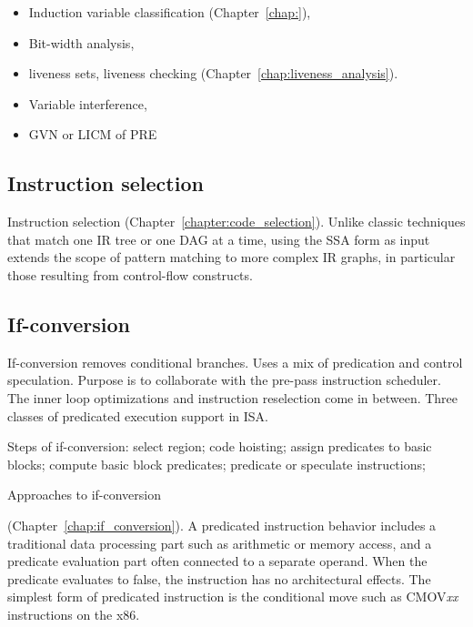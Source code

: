\begin{itemize}

\item Induction variable classification (Chapter~\ref{chap:}),

\item Bit-width analysis,

\item liveness sets, liveness checking
(Chapter~\ref{chap:liveness_analysis}).

\item Variable interference,

\item GVN or LICM of PRE

\end{itemize}

\subsection{Instruction selection}

Instruction selection (Chapter~\ref{chapter:code_selection}). Unlike
classic techniques that match one IR tree or one DAG at a time, using the SSA
form as input extends the scope of pattern matching to more complex IR graphs,
in particular those resulting from control-flow constructs.

\subsection{If-conversion}

If-conversion removes conditional branches. Uses a mix of predication and
control speculation. Purpose is to collaborate with the pre-pass instruction
scheduler. The inner loop optimizations and instruction reselection come in
between. Three classes of predicated execution support in ISA.
\cite{Mahlke:1995:ISCA} \cite{Chuang:2003:CGO}


Steps of if-conversion: select region; code hoisting; assign predicates to
basic blocks; compute basic block predicates; predicate or speculate
instructions;

Approaches to if-conversion

(Chapter~\ref{chap:if_conversion}). A predicated instruction behavior includes a
traditional data processing part such as arithmetic or memory access, and a
predicate evaluation part often connected to a separate operand. When the
predicate evaluates to false, the instruction has no architectural effects. The
simplest form of predicated instruction is the conditional move such as
CMOV\emph{xx} instructions on the x86. 

